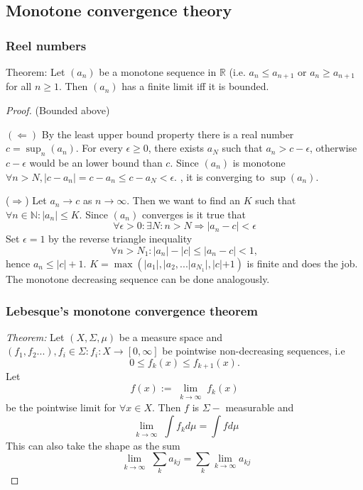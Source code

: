 \documentclass[titlepage]{article}
\begin{document}
\subsection*{Monotone convergence theory}
\subsubsection{Reel numbers}
Theorem: Let $(a_n)$ be a monotone sequence in $\mathbb{R}$ (i.e. $a_n \leq a_{n+1}$ or $a_n \geq a_{n+1}$ for all $n\geq1$. Then $(a_n)$ has a finite limit iff it is bounded.
\begin{proof}
(Bounded above)

$(\Leftarrow)$
By the least upper bound property there is a real number $c = \sup_n (a_n)$. For every $\epsilon \geq 0$, there exists $a_N$ such that $a_n > c-\epsilon$, otherwise $c-\epsilon$ would be an lower bound than $c$. Since $(a_n)$ is monotone $\forall n>N, |c-a_n| = c-a_n \leq c-a_N < \epsilon.$ , it is converging to $\sup(a_n)$.

($\Rightarrow$) Let $a_n \rightarrow c$ as $n\rightarrow \infty$. Then we want to find an $K$ such that $\forall n \in \mathbb{N}: |a_n|\leq K$. Since $(a_n)$ converges is it true that $$\forall \epsilon >0: \exists N: n>N \Longrightarrow |a_n - c| < \epsilon$$
Set  $\epsilon = 1$ by the reverse triangle inequality
$$\forall n >N_1 : |a_n| - |c| \leq |a_n - c| < 1,$$
hence $a_n \leq |c| + 1$.
$K = \max \left(|a_1|, |a_2, ...|a_{N_1}|, |c|+1\right)$ is finite and does the job. The monotone decreasing sequence can be done analogously.
\subsubsection{Lebesque's monotone convergence theorem}
\textit{Theorem:} Let $(X,\Sigma, \mu)$ be a measure space and $(f_1,f_2...), f_i \in \Sigma : f_i: X \rightarrow [0,\infty]$ be pointwise non-decreasing sequences, i.e
$$ 0 \leq f_k(x) \leq f_{k+1}(x).$$
Let
$$f(x) := \lim\limits_{\substack{k\rightarrow \infty}} f_k(x)$$
be the pointwise limit for $\forall x \in X.$
Then $f$ is $\Sigma-$ measurable and 
\begin{equation}
\lim\limits_{\substack{k\rightarrow \infty}}\int f_k d\mu = \int f d\mu 
\end{equation}
This can also take the shape as the sum
\begin{equation}
\lim\limits_{\substack{k\rightarrow \infty}}\sum_k a_{kj} = \sum_k \lim_{k\rightarrow \infty} a_{kj}
\end{equation}

\end{proof}
\end{document}
